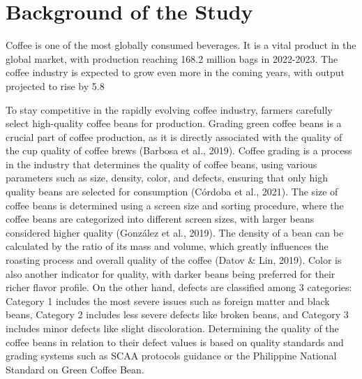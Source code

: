 \section{Background of the Study}

Coffee is one of the most globally consumed beverages. It is a vital product in the global market, with production reaching 168.2 million bags in 2022-2023. The coffee industry is expected to grow even more in the coming years, with output projected to rise by 5.8%

To stay competitive in the rapidly evolving coffee industry, farmers carefully select high-quality coffee beans for production. Grading green coffee beans is a crucial part of coffee production, as it is directly associated with the quality of the cup quality of coffee brews (Barbosa et al., 2019). Coffee grading is a process in the industry that determines the quality of coffee beans, using various parameters such as size, density, color, and defects, ensuring that only high quality beans are selected for consumption (Córdoba et al., 2021). The size of coffee beans is determined using a screen size and sorting procedure, where the coffee beans are categorized into different screen sizes, with larger beans considered higher quality (González et al., 2019). The density of a bean can be calculated by the ratio of its mass and volume, which greatly influences the roasting process and overall quality of the coffee (Datov \& Lin, 2019). Color is also another indicator for quality, with darker beans being preferred for their richer flavor profile. On the other hand, defects are classified among 3 categories: Category 1 includes the most severe issues such as foreign matter and black beans, Category 2 includes less severe defects like broken beans, and Category 3 includes minor defects like slight discoloration. Determining the quality of the coffee beans in relation to their defect values is based on quality standards and grading systems such as SCAA protocols guidance or the Philippine National Standard on Green Coffee Bean. 

